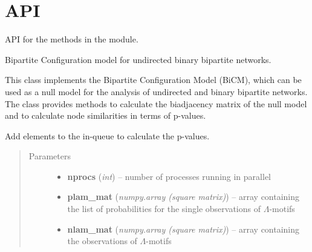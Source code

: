 \documentclass[letterpaper,10pt,english]{sphinxmanual}
\begin{document}
\section{API}
\label{source/src:api}\label{source/src::doc}\label{source/src:id1}
API for the methods in the  module.

\begin{fulllineitems}
\label{source/src:src.bicm.BiCM}
Bipartite Configuration model for undirected binary bipartite networks.

This class implements the Bipartite Configuration Model (BiCM), which can
be used as a null model for the analysis of undirected and binary bipartite
networks. The class provides methods to calculate the biadjacency matrix of
the null model and to calculate node similarities in terms of p-values.

\begin{fulllineitems}
\label{source/src:src.bicm.BiCM.add2inqueue}
Add elements to the in-queue to calculate the p-values.
\begin{quote}\begin{description}
\item[{Parameters}] \leavevmode\begin{itemize}
\item {} 
\textbf{nprocs} (\emph{int}) -- number of processes running in parallel

\item {} 
\textbf{plam\_mat} (\emph{numpy.array (square matrix)}) -- array containing the list of probabilities for the
single observations of \(\Lambda\)-motifs

\item {} 
\textbf{nlam\_mat} (\emph{numpy.array (square matrix)}) -- array containing the observations of
\(\Lambda\)-motifs

\end{itemize}

\end{description}\end{quote}

\end{fulllineitems}



\end{fulllineitems}
\end{document}
